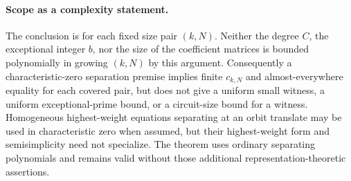 \paragraph{Scope as a complexity statement.}
The conclusion is for each fixed size pair $(k,N)$.  Neither the degree
$C$, the exceptional integer $b$, nor the size of the coefficient
matrices is bounded polynomially in growing $(k,N)$ by this argument.
Consequently a characteristic-zero separation premise implies finite
$c_{k,N}$ and almost-everywhere equality for each covered pair, but does
not give a uniform small witness, a uniform exceptional-prime bound,
or a circuit-size bound for a witness.  Homogeneous highest-weight
equations separating at an orbit translate may be used in characteristic
zero when assumed, but their highest-weight form and
semisimplicity need not specialize.  The theorem uses ordinary
separating polynomials and remains valid without those additional
representation-theoretic assertions.
